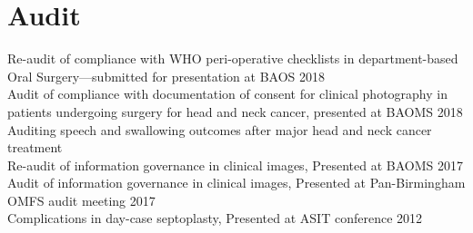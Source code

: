 \section*{Audit}

Re-audit of compliance with WHO peri-operative checklists in department-based Oral Surgery---submitted for presentation at BAOS 2018
\\
Audit of compliance with documentation of consent for clinical photography in patients undergoing surgery for head and neck cancer, presented at BAOMS 2018
\\
Auditing speech and swallowing outcomes after major head and neck cancer treatment
\\
Re-audit of information governance in clinical images, Presented at BAOMS 2017
\\
Audit of information governance in clinical images, Presented at Pan-Birmingham OMFS audit meeting 2017
\\
Complications in day-case septoplasty, Presented at ASIT conference 2012

